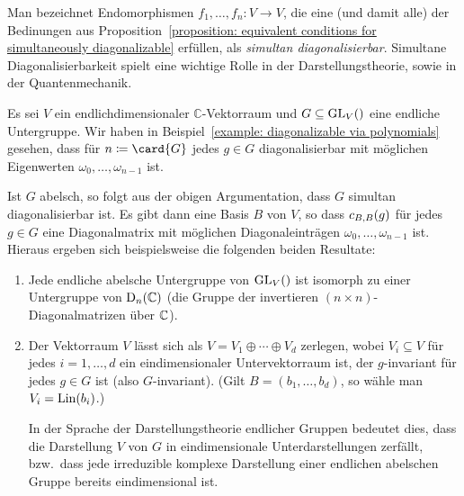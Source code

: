 Man bezeichnet Endomorphismen $f_1, \dotsc, f_n \colon V \to V$, die eine (und damit alle) der Bedinungen aus Proposition~\ref{proposition: equivalent conditions for simultaneously diagonalizable} erfüllen, als \emph{simultan diagonalisierbar}.
Simultane Diagonalisierbarkeit spielt eine wichtige Rolle in der Darstellungstheorie, sowie in der Quantenmechanik.

\begin{example}
  Es sei $V$ ein endlichdimensionaler $\mathbb{C}$-Vektorraum und $G \subseteq \GL{V}$ eine endliche Untergruppe.
  Wir haben in Beispiel~\ref{example: diagonalizable via polynomials} gesehen, dass für $n \defined \card{G}$ jedes $g \in G$ diagonalisierbar mit möglichen Eigenwerten $\omega_0, \dotsc, \omega_{n-1}$ ist.
  
  Ist $G$ abelsch, so folgt aus der obigen Argumentation, dass $G$ simultan diagonalisierbar ist.
  Es gibt dann eine Basis $B$ von $V$, so dass $\repmatrixendo{g}{B}$ für jedes $g \in G$ eine Diagonalmatrix mit möglichen Diagonaleinträgen $\omega_0, \dotsc, \omega_{n-1}$ ist.
  Hieraus ergeben sich beispielsweise die folgenden beiden Resultate:
  \begin{enumerate}
    \item
      Jede endliche abelsche Untergruppe von $\GL{V}$ ist isomorph zu einer Untergruppe von $\diagonalgroup{n}{\Complex}$ (die Gruppe der invertieren $(n \times n)$-Diagonalmatrizen über $\Complex$).
    \item
      Der Vektorraum $V$ lässt sich als $V = V_1 \oplus \dotsb \oplus V_d$ zerlegen, wobei $V_i \subseteq V$ für jedes $i = 1, \dotsc, d$ ein eindimensionaler Untervektorraum ist, der $g$-invariant für jedes $g \in G$ ist (also $G$-invariant).
      (Gilt $B = (b_1, \dotsc, b_d)$, so wähle man $V_i = \Lin(b_i)$.)
      
      In der Sprache der Darstellungstheorie endlicher Gruppen bedeutet dies, dass die Darstellung $V$ von $G$ in eindimensionale Unterdarstellungen zerfällt, bzw.\ dass jede irreduzible komplexe Darstellung einer endlichen abelschen Gruppe bereits eindimensional ist.
  \end{enumerate}
\end{example}
